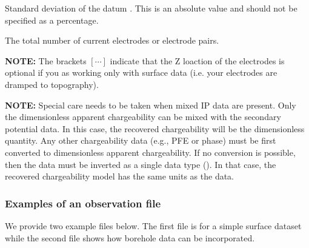 \begin{description}[leftmargin=5cm, style=sameline, align=left]
\item[\codeName{SD(i,j)}] Standard deviation of the datum . This is an absolute value and should not be specified as a percentage.
\item[\codeName{NC}] The total number of current electrodes or electrode pairs.
\end{description}

\textbf{NOTE:} The brackets $[\cdots]$ indicate that the Z loaction of the electrodes is optional if you as working only with surface data (i.e. your electrodes are dramped to topography).

\textbf{NOTE:} Special care needs to be taken when mixed IP data are present. Only the dimensionless apparent chargeability can be mixed with the secondary potential data. In this case, the recovered chargeability will be the dimensionless quantity. Any other chargeability data (e.g., PFE or phase) must be first converted to dimensionless apparent chargeability. If no conversion is possible, then the data must be inverted as a single data type (). In that case, the recovered chargeability model has the same units as the data.

\subsubsection*{Examples of an observation file}

We provide two example files below. The first file is for a simple surface dataset while the second file shows how borehole data can be incorporated. 

